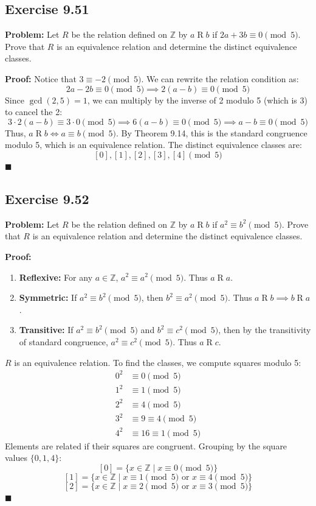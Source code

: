 \documentclass[11pt, a4paper]{article}
\theoremstyle{definition}
\theoremstyle{remark}
\begin{document}
\subsection*{Exercise 9.51}
\textbf{Problem:} Let $R$ be the relation defined on $\mathbb{Z}$ by $a \mathrel{R} b$ if $2a + 3b \equiv 0 \pmod{5}$. Prove that $R$ is an equivalence relation and determine the distinct equivalence classes.

\textbf{Proof:}
Notice that $3 \equiv -2 \pmod{5}$. We can rewrite the relation condition as:
\[ \displaystyle 2a - 2b \equiv 0 \pmod{5} \implies 2(a - b) \equiv 0 \pmod{5} \]
Since $\gcd(2, 5) = 1$, we can multiply by the inverse of 2 modulo 5 (which is 3) to cancel the 2:
\[ \displaystyle 3 \cdot 2(a - b) \equiv 3 \cdot 0 \pmod{5} \implies 6(a - b) \equiv 0 \pmod{5} \implies a - b \equiv 0 \pmod{5} \]
Thus, $a \mathrel{R} b \iff a \equiv b \pmod{5}$. By Theorem 9.14, this is the standard congruence modulo 5, which is an equivalence relation. 
The distinct equivalence classes are:
\[ \displaystyle [0], [1], [2], [3], [4] \pmod{5} \]
$\blacksquare$

\subsection*{Exercise 9.52}
\textbf{Problem:} Let $R$ be the relation defined on $\mathbb{Z}$ by $a \mathrel{R} b$ if $a^2 \equiv b^2 \pmod{5}$. Prove that $R$ is an equivalence relation and determine the distinct equivalence classes.

\textbf{Proof:}
\begin{enumerate}
    \item \textbf{Reflexive:} For any $a \in \mathbb{Z}$, $a^2 \equiv a^2 \pmod{5}$. Thus $a \mathrel{R} a$.
    \item \textbf{Symmetric:} If $a^2 \equiv b^2 \pmod{5}$, then $b^2 \equiv a^2 \pmod{5}$. Thus $a \mathrel{R} b \implies b \mathrel{R} a$.
    \item \textbf{Transitive:} If $a^2 \equiv b^2 \pmod{5}$ and $b^2 \equiv c^2 \pmod{5}$, then by the transitivity of standard congruence, $a^2 \equiv c^2 \pmod{5}$. Thus $a \mathrel{R} c$.
\end{enumerate}
$R$ is an equivalence relation. To find the classes, we compute squares modulo 5:
\begin{align*}
    0^2 &\equiv 0 \pmod{5} \\
    1^2 &\equiv 1 \pmod{5} \\
    2^2 &\equiv 4 \pmod{5} \\
    3^2 &\equiv 9 \equiv 4 \pmod{5} \\
    4^2 &\equiv 16 \equiv 1 \pmod{5}
\end{align*}
Elements are related if their squares are congruent. Grouping by the square values $\{0, 1, 4\}$:
\[ \displaystyle [0] = \{ x \in \mathbb{Z} \mid x \equiv 0 \pmod{5} \} \]
\[ \displaystyle [1] = \{ x \in \mathbb{Z} \mid x \equiv 1 \pmod{5} \text{ or } x \equiv 4 \pmod{5} \} \]
\[ \displaystyle [2] = \{ x \in \mathbb{Z} \mid x \equiv 2 \pmod{5} \text{ or } x \equiv 3 \pmod{5} \} \]
$\blacksquare$
\end{document}
